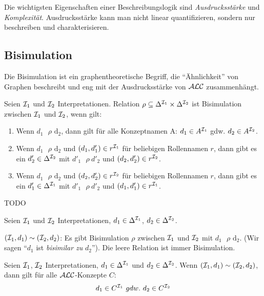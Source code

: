 Die wichtigsten Eigenschaften einer Beschreibungslogik sind
\emph{Ausdrucksstärke} und \emph{Komplexität}. Ausdrucksstärke kann man nicht
linear quantifizieren, sondern nur beschreiben und charakterisieren.

\subsection{Bisimulation}\label{bisimulation}

Die Bisimulation ist ein graphentheoretische Begriff, die \enquote{Ähnlichkeit} von Graphen beschreibt und eng mit der Ausdrucksstärke von $\mathcal{A}\mathcal{L}\mathcal{C}$ zusammenhängt.

\begin{definition}[Bisimulation]

Seien $\mathcal{I}_1$ und $\mathcal{I}_2$ Interpretationen. Relation
$\rho \subseteq \Delta^{\mathcal{I}_1} \times \Delta^{\mathcal{I}_2}$ ist Bisimulation
zwischen $\mathcal{I}_1$ und $\mathcal{I}_2$, wenn gilt:

\begin{enumerate}
\def\labelenumi{\arabic{enumi}.}
\item
  Wenn $d_1\text{\ $\rho$}\text{\ d}_2$, dann gilt für alle
  Konzeptnamen A: $d_1 \in A^{\mathcal{I}_1}$ gdw. $d_2 \in A^{\mathcal{I}_2}$.
\item
  Wenn $d_1\text{\ $\rho$}\text{\ d}_2$ und
  $\left( d_1,d_1' \right) \in r^{\MI_1}$ für beliebigen
  Rollennamen $r$, dann gibt es ein $d_2' \in \Delta^{\mathcal{I}_2}$
  mit ${d'}_1\text{\ $\rho$}{\ d'}_2$ und
  $\left( d_2,d_2' \right) \in r^{\MI_2}$.
\item
  Wenn $d_1\text{\ $\rho$}\text{\ d}_2$ und
  $\left( d_2,d_2' \right) \in r^{\MI_2}$ für beliebigen
  Rollennamen $r$, dann gibt es ein $d_1' \in \Delta^{\mathcal{I}_1}$
  mit ${d'}_1\text{\ $\rho$}{\ d'}_2$ und
  $\left( d_1,d_1' \right) \in r^{\MI_1}$.
\end{enumerate}
\end{definition}

\begin{tafel}[TODO]
    TODO
\end{tafel}

Seien $\mathcal{I}_1$ und $\mathcal{I}_2$ Interpretationen,
$d_1 \in \Delta^{\mathcal{I}_1}$, $d_2 \in \Delta^{\mathcal{I}_2}$.

$(\mathcal{I}_1,d_1) \sim (\mathcal{I}_2,d_2)$: Es gibt Bisimulation $\rho$
zwischen $\mathcal{I}_1$ und $\mathcal{I}_2$ mit $d_1\text{\ $\rho$}\text{\ d}_2$. (Wir sagen \enquote{$d_1$ ist \emph{bisimilar zu} $d_2$}).
Die leere Relation ist immer Bisimulation.

\begin{theorem}[Bisimulationstheorem]
    \label{thm:bisim}
Seien $\mathcal{I}_1$, $\mathcal{I}_2$ Interpretationen,
$d_1 \in \Delta^{\mathcal{I}_1}$ und $d_2 \in \Delta^{\mathcal{I}_2}$. Wenn
$(\mathcal{I}_1,d_1) \sim (\mathcal{I}_2,d_2)$, dann gilt für alle $\mathcal{A}\mathcal{L}\mathcal{C}$-Konzepte
$C$:
\[d_1 \in C^{\mathcal{I}_1}\ gdw.\ d_2 \in C^{\mathcal{I}_2}\]
\end{theorem}

